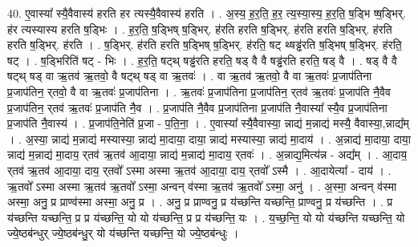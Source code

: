 \documentclass[17pt]{extarticle}
\begin{document}
40. ए॒वास्या᳚ स्यै॒वैवास्य॑ हरति हर त्यस्यै॒वैवास्य॑ हरति । . अ॒स्य॒ ह॒र॒ति॒ ह॒र॒ त्य॒स्या॒स्य॒ ह॒र॒ति॒ ष॒ड्भि ष्ष॒ड्भिर्. ह॑र त्यस्यास्य हरति ष॒ड्भिः । . ह॒र॒ति॒ ष॒ड्भिष् ष॒ड्भिर्. ह॑रति हरति ष॒ड्भिर्. ह॑रति हरति ष॒ड्भिर्. ह॑रति हरति ष॒ड्भिर्. ह॑रति । . ष॒ड्भिर्. ह॑रति हरति ष॒ड्भिष् ष॒ड्भिर्. ह॑रति॒ षट् थ्षड्ढ॑रति ष॒ड्भिष् ष॒ड्भिर्. ह॑रति॒ षट् । . ष॒ड्भिरिति॑ षट् - भिः । . ह॒र॒ति॒ षट्थ् षड्ढ॑रति हरति॒ षड् वै वै षड्ढ॑रति हरति॒ षड् वै । . षड् वै वै षट्थ् षड् वा ऋ॒तव॑ ऋ॒तवो॒ वै षट्थ् षड् वा ऋ॒तवः॑ । . वा ऋ॒तव॑ ऋ॒तवो॒ वै वा ऋ॒तवः॑ प्र॒जाप॑तिना प्र॒जाप॑तिन॒ र्‌तवो॒ वै वा ऋ॒तवः॑ प्र॒जाप॑तिना । . ऋ॒तवः॑ प्र॒जाप॑तिना प्र॒जाप॑तिन॒ र्‌तव॑ ऋ॒तवः॑ प्र॒जाप॑ति नै॒वैव प्र॒जाप॑तिन॒ र्‌तव॑ ऋ॒तवः॑ प्र॒जाप॑ति नै॒व । . प्र॒जाप॑ति नै॒वैव प्र॒जाप॑तिना प्र॒जाप॑ति नै॒वास्या᳚ स्यै॒व प्र॒जाप॑तिना प्र॒जाप॑ति नै॒वास्य॑ । . प्र॒जाप॑ति॒नेति॑ प्र॒जा - प॒ति॒ना॒ । . ए॒वास्या᳚ स्यै॒वैवास्या॒ न्नाद्य॑ म॒न्नाद्य॑ मस्यै॒ वैवास्या॒,न्नाद्य᳚म् । . अ॒स्या॒ न्नाद्य॑ म॒न्नाद्य॑ मस्यास्या॒ न्नाद्य॑ मा॒दाया॒ दाया॒ न्नाद्य॑ मस्यास्या॒ न्नाद्य॑ मा॒दाय॑ । . अ॒न्नाद्य॑ मा॒दाया॒ दाया॒ न्नाद्य॑ म॒न्नाद्य॑ मा॒दाय॒ र्‌तव॑ ऋ॒तव॑ आ॒दाया॒ न्नाद्य॑ म॒न्नाद्य॑ मा॒दाय॒ र्‌तवः॑ । . अ॒न्नाद्य॒मित्य॑न्न - अद्य᳚म् । . आ॒दाय॒ र्‌तव॑ ऋ॒तव॑ आ॒दाया॒ दाय॒ र्‌तवो᳚ ऽस्मा अस्मा ऋ॒तव॑ आ॒दाया॒ दाय॒ र्‌तवो᳚ ऽस्मै । . आ॒दायेत्या᳚ - दाय॑ । . ऋ॒तवो᳚ ऽस्मा अस्मा ऋ॒तव॑ ऋ॒तवो᳚ ऽस्मा॒ अन्वन् व॑स्मा ऋ॒तव॑ ऋ॒तवो᳚ ऽस्मा॒ अनु॑ । . अ॒स्मा॒ अन्वन् व॑स्मा अस्मा॒ अनु॒ प्र प्राण्व॑स्मा अस्मा॒ अनु॒ प्र । . अनु॒ प्र प्राण्वनु॒ प्र य॑च्छन्ति यच्छन्ति॒ प्राण्वनु॒ प्र य॑च्छन्ति । . प्र य॑च्छन्ति यच्छन्ति॒ प्र प्र य॑च्छन्ति॒ यो यो य॑च्छन्ति॒ प्र प्र य॑च्छन्ति॒ यः । . य॒च्छ॒न्ति॒ यो यो य॑च्छन्ति यच्छन्ति॒ यो ज्ये॒ष्ठब॑न्धुर् ज्ये॒ष्ठब॑न्धु॒र् यो य॑च्छन्ति यच्छन्ति॒ यो ज्ये॒ष्ठब॑न्धुः । \newline
\pagebreak
{}
\end{document}

